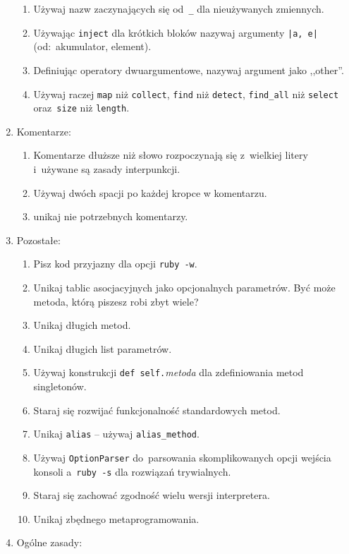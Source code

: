 \begin{enumerate}
\begin{enumerate}
    \item Używaj nazw zaczynających się od~\texttt{\_} dla nieużywanych zmiennych.
    \item Używając \texttt{inject} dla krótkich bloków nazywaj argumenty \texttt{|a, e|} (od:~akumulator, element).
    \item Definiując operatory dwuargumentowe, nazywaj argument jako ,,other''.
    \item Używaj raczej \texttt{map} niż \texttt{collect}, \texttt{find} niż \texttt{detect}, \texttt{find\_all} niż \texttt{select} oraz~\texttt{size} niż \texttt{length}.
  \end{enumerate}
  \item Komentarze:
  \begin{enumerate}
    \item Komentarze dłuższe niż słowo rozpoczynają się z~wielkiej litery i~używane są zasady interpunkcji.
    \item Używaj dwóch spacji po każdej kropce w komentarzu.
    \item unikaj nie potrzebnych komentarzy.
  \end{enumerate}
  \item Pozostałe:
  \begin{enumerate}
    \item Pisz kod przyjazny dla opcji \texttt{ruby -w}.
    \item Unikaj tablic asocjacyjnych jako opcjonalnych parametrów. Być może metoda, którą piszesz robi zbyt wiele?
    \item Unikaj długich metod.
    \item Unikaj długich list parametrów.
    \item Używaj konstrukcji \texttt{def self.}\textit{metoda} dla zdefiniowania metod singletonów.
    \item Staraj się rozwijać funkcjonalność standardowych metod.
    \item Unikaj \texttt{alias} -- używaj \texttt{alias\_method}.
    \item Używaj \texttt{OptionParser} do~parsowania skomplikowanych opcji wejścia konsoli a~\texttt{ruby -s} dla rozwiązań trywialnych.
    \item Staraj się zachować zgodność wielu wersji interpretera.
    \item Unikaj zbędnego metaprogramowania.
  \end{enumerate}
  \item Ogólne zasady:
  \begin{enumerate}

\end{enumerate}
\end{enumerate}
